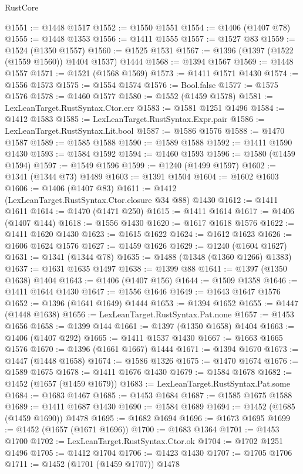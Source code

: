 \begin{lexlean}{RustCore}
\begin{coremodule}
@1551 := @1448 @1517
@1552 := @1550 @1551
@1554 := @1406 (@1407 @78)
@1555 := @1448 @1353
@1556 := @1411 @1555
@1557 := @1527 @83
@1559 := @1524 (@1350 @1557)
@1560 := @1525 @1531
@1567 := @1396 (@1397 (@1522 (@1559 @1560)) @1404 @1537) @1444
@1568 := @1394 @1567
@1569 := @1448 @1557
@1571 := @1521 (@1568 @1569)
@1573 := @1411 @1571 @1430
@1574 := @1556 @1573
@1575 := @1554 @1574
@1576 := Bool.false
@1577 := @1575 @1576
@1578 := @1460 @1577
@1580 := @1552 (@1459 @1578)
@1581 := LexLeanTarget.RustSyntax.Ctor.err
@1583 := @1581 @1251 @1496
@1584 := @1412 @1583
@1585 := LexLeanTarget.RustSyntax.Expr.pair
@1586 := LexLeanTarget.RustSyntax.Lit.bool
@1587 := @1586 @1576
@1588 := @1470 @1587
@1589 := @1585 @1588
@1590 := @1589 @1588
@1592 := @1411 @1590 @1430
@1593 := @1584 @1592
@1594 := @1460 @1593
@1596 := @1580 (@1459 @1594)
@1597 := @1549 @1596
@1599 := @1240 (@1499 @1597)
@1602 := @1341 (@1344 @73) @1489
@1603 := @1391 @1504
@1604 := @1602 @1603
@1606 := @1406 (@1407 @83)
@1611 := @1412 (LexLeanTarget.RustSyntax.Ctor.closure @34 @88) @1430
@1612 := @1411 @1611
@1614 := @1470 (@1471 @250)
@1615 := @1411 @1614
@1617 := @1406 (@1407 @144)
@1618 := @1556 @1430
@1620 := @1617 @1618 @1576
@1622 := @1411 @1620 @1430
@1623 := @1615 @1622
@1624 := @1612 @1623
@1626 := @1606 @1624 @1576
@1627 := @1459 @1626
@1629 := @1240 (@1604 @1627)
@1631 := @1341 (@1344 @78)
@1635 := @1488 (@1348 (@1360 @1266) @1383)
@1637 := @1631 @1635 @1497
@1638 := @1399 @88
@1641 := @1397 (@1350 @1638) @1404
@1643 := @1406 (@1407 @156)
@1644 := @1509 @1358
@1646 := @1411 @1644 @1430
@1647 := @1556 @1646
@1649 := @1643 @1647 @1576
@1652 := @1396 (@1641 @1649) @1444
@1653 := @1394 @1652
@1655 := @1447 (@1448 @1638)
@1656 := LexLeanTarget.RustSyntax.Pat.none
@1657 := @1453 @1656
@1658 := @1399 @144
@1661 := @1397 (@1350 @1658) @1404
@1663 := @1406 (@1407 @292)
@1665 := @1411 @1537 @1430
@1667 := @1663 @1665 @1576
@1670 := @1396 (@1661 @1667) @1444
@1671 := @1394 @1670
@1673 := @1447 (@1448 @1658)
@1674 := @1586 @1326
@1675 := @1470 @1674
@1676 := @1589 @1675
@1678 := @1411 @1676 @1430
@1679 := @1584 @1678
@1682 := @1452 (@1657 (@1459 @1679))
@1683 := LexLeanTarget.RustSyntax.Pat.some
@1684 := @1683 @1467
@1685 := @1453 @1684
@1687 := @1585 @1675 @1588
@1689 := @1411 @1687 @1430
@1690 := @1584 @1689
@1694 := @1452 (@1685 (@1459 @1690)) @1478
@1695 := @1682 @1694
@1696 := @1673 @1695
@1699 := @1452 (@1657 (@1671 @1696))
@1700 := @1683 @1364
@1701 := @1453 @1700
@1702 := LexLeanTarget.RustSyntax.Ctor.ok
@1704 := @1702 @1251 @1496
@1705 := @1412 @1704
@1706 := @1423 @1430
@1707 := @1705 @1706
@1711 := @1452 (@1701 (@1459 @1707)) @1478

\end{coremodule}
\end{lexlean}
